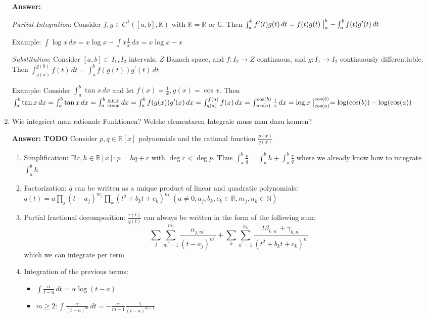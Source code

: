 \documentclass[11pt]{article}
\newcommand{\RR}[0]{\mathbb{R}}
\newcommand{\CC}[0]{\mathbb{C}}
\newcommand{\NN}[0]{\mathbb{N}}
\newcommand{\KK}[0]{\mathbb{K}}
\begin{document}
\begin{enumerate}
    \textbf{Answer:}

    \textit{Partial Integration}: Consider $f, g \in C^1([a, b], \KK)$ with $\KK = \RR$ or $\CC$. Then $\int_a^b f^\prime(t) g(t)\,dt = f(t) g(t)\bigm|_a^b - \int_a^b f(t) g^\prime(t)\,dt$

    Example: $\int \log{x} \,dx = x \log{x} - \int x \frac{1}{x} \,dx = x \log{x} - x$

    \textit{Substitution}: Consider $[a, b] \subset I_1, I_2$ intervals, $Z$ Banach space, and $f: I_2 \to Z$ continuous, and $g\colon I_1 \to I_2$ continuously differentiable. Then $\int_{g(a)}^{g(b)} f(t)\,dt = \int_a^b f(g(t)) g^\prime(t) \,dt$

    Example: Consider $\int_a^b \tan{x} \,dx$ and let $f(x) = \frac{1}{x}, g(x) = \cos{x}$. Then $\int_a^b \tan{x} \,dx = \int_a^b \tan{x}\,dx = \int_a^b \frac{\sin{x}}{\cos{x}}\,dx = \int_a^b f(g(x)) g^\prime(x) \,dx = \int_{g(a)}^{f(a)} f(x) \,dx = \int_{\cos(a)}^{\cos(b)} \frac{1}{x}\,dx = \log{x}\bigm|_{\cos(a)}^{\cos(b)} = \log(\cos(b)) - \log(\cos(a))$

    \item Wie integriert man rationale Funktionen? Welche elementaren Integrale muss man dazu kennen?

    \textbf{Answer: TODO} Consider $p, q \in \RR\!\left[x\right]$ polynomials and the rational function $\frac{p(x)}{q(x)}$

    \begin{enumerate}
        \item Simplification: $\exists! r,h \in \RR\!\left[x\right]\colon p = h q + r$ with $\deg{r} < \deg{p}$. Thus $\int_a^b \frac{p}{q} = \int_a^b h  + \int_a^b \frac{r}{q}$ where we already know how to integrate $\int_a^b h$
        \item Factorization: $q$ can be written as a unique product of linear and quadratic polynomials: \\$q(t) = a\prod_j(t-a_j)^{m_j}\prod_k(t^2 + b_k t + c_k)^{n_k}~(a \neq 0, a_j, b_k, c_k \in \RR, m_j, n_k \in \NN)$
        \item Partial fractional decomposition: $\frac{r(t)}{q(t)}$ can always be written in the form of the following sum: $$\sum_j \sum_{m^\prime = 1}^{m_j} \frac{\alpha_{j,m^\prime}}{(t-a_j)^{m^\prime}} + \sum_k \sum_{n^\prime = 1}^{n_k} \frac{ t \beta_{k,n^\prime} + \gamma_{k,n^\prime}}{(t^2 + b_k t + c_k)^{n^\prime}} $$ which we can integrate per term
        \item Integration of the previous terms:
        \begin{itemize}
            \item $\int \frac{\alpha}{t-a} \,dt = \alpha \log{(t-a)}$
            \item $m\ge 2: \int \frac{\alpha}{(t-a)^m} \,dt = -\frac{\alpha}{m-1} \frac{1}{(t-a)^{m-1}}$
        \end{itemize}
    \end{enumerate}


\end{enumerate}
\end{document}
